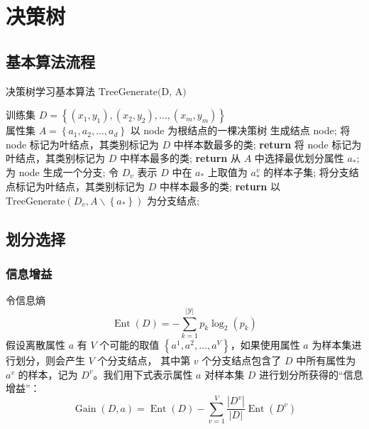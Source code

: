 \section{决策树}
\subsection{基本算法流程}
\begin{algorithm}
    \renewcommand{\algorithmicrequire}{\textbf{Input:}}
	\renewcommand{\algorithmicensure}{\textbf{Output:}}
    \caption{决策树学习基本算法 $\text{TreeGenerate(D, A)}$}
    \begin{algorithmic}[1]
        \REQUIRE 训练集 $D = \left\{(x_1, y_1), (x_2, y_2), \dots, (x_m, y_m)\right\}$ \\ \qquad 属性集 $A = \left\{a_1, a_2, \dots, a_d\right\}$
        \ENSURE 以 node 为根结点的一棵决策树
        \STATE 生成结点 node;
        \STATE 将 node 标记为叶结点，其类别标记为 $D$ 中样本数最多的类;
        \STATE \textbf{return}
        \ENDIF
        \STATE 将 node 标记为叶结点，其类别标记为 $D$ 中样本最多的类;
        \STATE \textbf{return}
        \ENDIF
        \STATE 从 $A$ 中选择最优划分属性 $a_*$;
        \STATE 为 node 生成一个分支;
        \STATE 令 $D_v$ 表示 $D$ 中在 $a_*$ 上取值为 $a_*^v$ 的样本子集;
        \STATE 将分支结点标记为叶结点，其类别标记为 $D$ 中样本最多的类;
        \STATE \textbf{return}
        \ELSE
        \STATE 以 $\text{TreeGenerate}\left(D_v, A \backslash \left\{a_*\right\}\right)$ 为分支结点;
        \ENDIF
        \ENDFOR
    \end{algorithmic}
\end{algorithm}
\subsection{划分选择}
\subsubsection{信息增益}
令信息熵
\begin{equation}
    \operatorname{Ent}(D) = -\sum\limits_{k=1}^{|\mathcal{Y}|}p_k\log _2(p_k)
\end{equation}
假设离散属性 $a$ 有 $V$ 个可能的取值 $\left\{a^1, a^2, \dots, a^V\right\}$，如果使用属性 $a$ 为样本集进行划分，则会产生 $V$ 个分支结点，
其中第 $v$ 个分支结点包含了 $D$ 中所有属性为 $a^v$ 的样本，记为 $D^v$。我们用下式表示属性 $a$ 对样本集 $D$ 进行划分所获得的“信息增益”：
\begin{equation}
    \operatorname{Gain}(D, a) = \operatorname{Ent}(D) - \sum\limits_{v = 1}^V
    {\dfrac{|D^v|}{|D|}\operatorname{Ent}(D^v)}
\end{equation}

